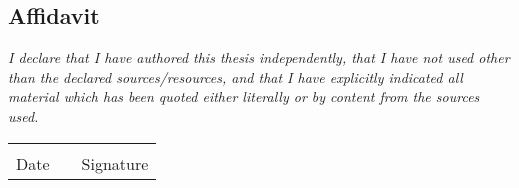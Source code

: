 \cleardoublepage
\thispagestyle{empty}
\vspace*{2cm}
{
	\newcommand{\tugonline}{The text document uploaded to TUGRAZonline is identical to the present doctoral thesis.}
	\newcommand{\tugonlineDE}{Das in TUGRAZonline hochgeladene Textdokument ist mit der vorliegenden Dissertation identisch.}
}{
	\newcommand{\tugonline}{The text document uploaded to TUGRAZonline is identical to the present master's thesis.}
	\newcommand{\tugonlineDE}{Das in TUGRAZonline hochgeladene Textdokument ist mit der vorliegenden Masterarbeit identisch.}
}
\subsection*{Affidavit}
\noindent
\textit{I declare that I have authored this thesis independently, that I have
not used other than the declared sources/resources, and that I have
explicitly indicated all material which has been quoted either literally
or by content from the sources used.}

\textit{\tugonline}
\vspace*{1cm}
\begin{flushleft}
	\begin{tabular}{ccc}
		\underline{\hspace*{3.8cm}} & \hspace*{5cm} &  \underline{\hspace*{4.5cm}} \\
		Date & & Signature \\
	\end{tabular}
\end{flushleft}
\vspace*{2cm}





